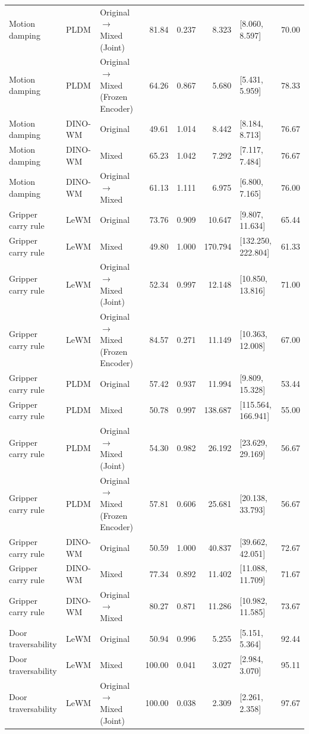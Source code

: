 \begin{longtable}{@{}p{1.8cm}lp{3.65cm}rrrp{2.5cm}r@{}}
Motion damping & PLDM & Original $\rightarrow$ Mixed (Joint) & 81.84 & 0.237 & 8.323 & [8.060, 8.597] & 70.00 \\
Motion damping & PLDM & Original $\rightarrow$ Mixed (Frozen Encoder) & 64.26 & 0.867 & 5.680 & [5.431, 5.959] & 78.33 \\
Motion damping & DINO-WM & Original & 49.61 & 1.014 & 8.442 & [8.184, 8.713] & 76.67 \\
Motion damping & DINO-WM & Mixed & 65.23 & 1.042 & 7.292 & [7.117, 7.484] & 76.67 \\
Motion damping & DINO-WM & Original $\rightarrow$ Mixed & 61.13 & 1.111 & 6.975 & [6.800, 7.165] & 76.00 \\
\midrule
Gripper carry rule & LeWM & Original & 73.76 & 0.909 & 10.647 & [9.807, 11.634] & 65.44 \\
Gripper carry rule & LeWM & Mixed & 49.80 & 1.000 & 170.794 & [132.250, 222.804] & 61.33 \\
Gripper carry rule & LeWM & Original $\rightarrow$ Mixed (Joint) & 52.34 & 0.997 & 12.148 & [10.850, 13.816] & 71.00 \\
Gripper carry rule & LeWM & Original $\rightarrow$ Mixed (Frozen Encoder) & 84.57 & 0.271 & 11.149 & [10.363, 12.008] & 67.00 \\
Gripper carry rule & PLDM & Original & 57.42 & 0.937 & 11.994 & [9.809, 15.328] & 53.44 \\
Gripper carry rule & PLDM & Mixed & 50.78 & 0.997 & 138.687 & [115.564, 166.941] & 55.00 \\
Gripper carry rule & PLDM & Original $\rightarrow$ Mixed (Joint) & 54.30 & 0.982 & 26.192 & [23.629, 29.169] & 56.67 \\
Gripper carry rule & PLDM & Original $\rightarrow$ Mixed (Frozen Encoder) & 57.81 & 0.606 & 25.681 & [20.138, 33.793] & 56.67 \\
Gripper carry rule & DINO-WM & Original & 50.59 & 1.000 & 40.837 & [39.662, 42.051] & 72.67 \\
Gripper carry rule & DINO-WM & Mixed & 77.34 & 0.892 & 11.402 & [11.088, 11.709] & 71.67 \\
Gripper carry rule & DINO-WM & Original $\rightarrow$ Mixed & 80.27 & 0.871 & 11.286 & [10.982, 11.585] & 73.67 \\
\midrule
Door traversability & LeWM & Original & 50.94 & 0.996 & 5.255 & [5.151, 5.364] & 92.44 \\
Door traversability & LeWM & Mixed & 100.00 & 0.041 & 3.027 & [2.984, 3.070] & 95.11 \\
Door traversability & LeWM & Original $\rightarrow$ Mixed (Joint) & 100.00 & 0.038 & 2.309 & [2.261, 2.358] & 97.67 \\

\end{longtable}
